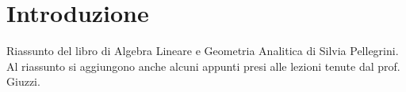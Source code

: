 \documentclass[../main.tex]{subfiles}
\begin{document}
\section{Introduzione}
Riassunto del libro di Algebra Lineare e Geometria Analitica di Silvia
Pellegrini. Al riassunto si aggiungono anche alcuni appunti presi alle lezioni
tenute dal prof. Giuzzi.
\end{document}

